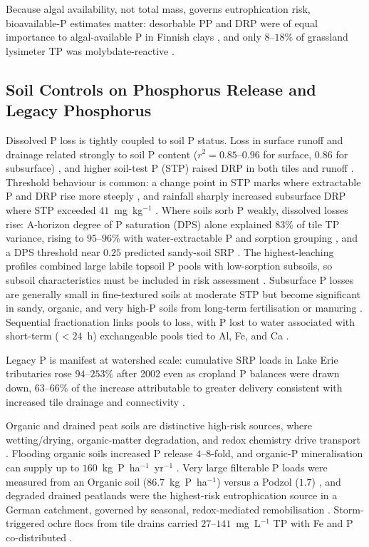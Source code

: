 \documentclass[11pt]{article}
\begin{document}
Because algal availability, not total mass, governs eutrophication risk,
bioavailable-P estimates matter: desorbable PP and DRP were of equal
importance to algal-available P in Finnish clays
\parencite{Uusitalo2001,Uusitalo2003}, and only $8$--$18\%$ of grassland
lysimeter TP was molybdate-reactive \parencite{Bilotta2008}.

\subsection{Soil Controls on Phosphorus Release and Legacy Phosphorus}

Dissolved P loss is tightly coupled to soil P status. Loss in surface runoff
and drainage related strongly to soil P content
($r^2 = 0.85$--$0.96$ for surface, $0.86$ for subsurface)
\parencite{Sharpley1995}, and higher soil-test P (STP) raised DRP in both
tiles and runoff \parencite{Osterholz2020}. Threshold behaviour is common: a
change point in STP marks where extractable P and DRP rise more steeply
\parencite{McDowell2001b}, and rainfall sharply increased subsurface DRP
where STP exceeded $41$~mg~kg$^{-1}$ \parencite{Ni2020}. Where soils sorb P
weakly, dissolved losses rise: A-horizon degree of P saturation (DPS) alone
explained $83\%$ of tile TP variance, rising to $95$--$96\%$ with
water-extractable P and sorption grouping \parencite{Beauchemin2003}, and a
DPS threshold near $0.25$ predicted sandy-soil SRP \parencite{Siemens2004}.
The highest-leaching profiles combined large labile topsoil P pools with
low-sorption subsoils, so subsoil characteristics must be included in risk
assessment \parencite{Liu2024b}. Subsurface P losses are generally small in
fine-textured soils at moderate STP but become significant in sandy,
organic, and very high-P soils from long-term fertilisation or manuring
\parencite{Sims1998}. Sequential fractionation links pools to loss, with P
lost to water associated with short-term ($<24$~h) exchangeable pools tied to
Al, Fe, and Ca \parencite{McDowell2001}.

Legacy P is manifest at watershed scale: cumulative SRP loads in Lake Erie
tributaries rose $94$--$253\%$ after 2002 even as cropland P balances were
drawn down, $63$--$66\%$ of the increase attributable to greater delivery
consistent with increased tile drainage and connectivity
\parencite{Jarvie2017}.

Organic and drained peat soils are distinctive high-risk sources, where
wetting/drying, organic-matter degradation, and redox chemistry drive
transport \parencite{Grenon2021}. Flooding organic soils increased P release
$4$--$8$-fold, and organic-P mineralisation can supply up to
$160$~kg~P~ha$^{-1}$~yr$^{-1}$ \parencite{Sharpley1995}. Very large filterable
P loads were measured from an Organic soil ($86.7$~kg~P~ha$^{-1}$) versus a
Podzol ($1.7$) \parencite{McDowell2015b}, and degraded drained peatlands were
the highest-risk eutrophication source in a German catchment, governed by
seasonal, redox-mediated remobilisation \parencite{Tiemeyer2009,YliHalla2022}.
Storm-triggered ochre flocs from tile drains carried $27$--$141$~mg~L$^{-1}$
TP with Fe and P co-distributed \parencite{Zimmer2016}.
\end{document}
